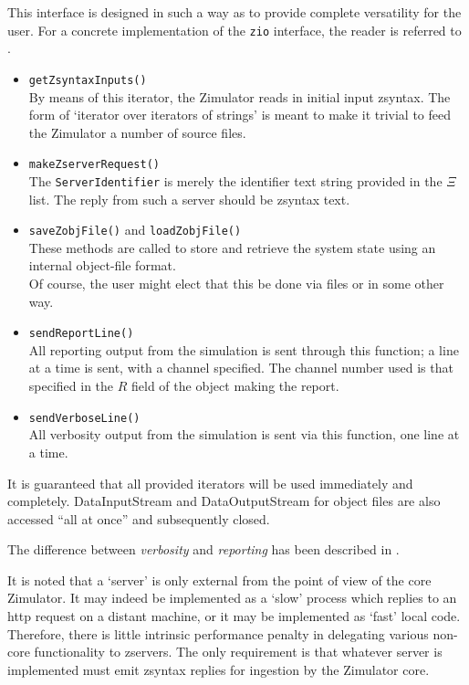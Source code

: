 This interface is designed in such a way as to provide complete versatility for the user.
For a concrete implementation of the {\tt zio} interface, the reader is referred to .

\begin{itemize}
\item {\tt getZsyntaxInputs()} \\
  By means of this iterator, the Zimulator reads in initial input zsyntax.
  The form of `iterator over iterators of strings' is meant to make it trivial to feed the Zimulator a number of source files.
\item {\tt makeZserverRequest()} \\
  The {\tt ServerIdentifier} is merely the identifier text string provided in the  $\Xi$ list.
  The reply from such a server should be zsyntax text.
\item {\tt saveZobjFile()} and {\tt loadZobjFile()} \\
  These methods are called to store and retrieve the system state using an internal object-file format.\\
  Of course, the user might elect that this be done via files or in some other way.
\item {\tt sendReportLine()} \\
  All reporting output from the simulation is sent through this function; a line at a time is sent,
  with a channel specified. The channel number used is that specified in the $R$ field of the object making the report.
\item {\tt sendVerboseLine()} \\
  All verbosity output from the simulation is sent via this function, one line at a time.
\end{itemize}
It is guaranteed that all provided iterators will be used immediately and completely.
DataInputStream and DataOutputStream for object files are also accessed ``all at once''
and subsequently closed.

The difference between \emph{verbosity} and \emph{reporting} has been described in .

It is noted that a `server' is only external from the point of view of the core Zimulator.
It may indeed be implemented as a `slow' process which replies to an http request on a distant machine,
or it may be implemented as `fast' local code. Therefore, there is little intrinsic performance penalty
in delegating various non-core functionality to zservers. The only requirement is that whatever
server is implemented must emit zsyntax replies for ingestion by the Zimulator core.

